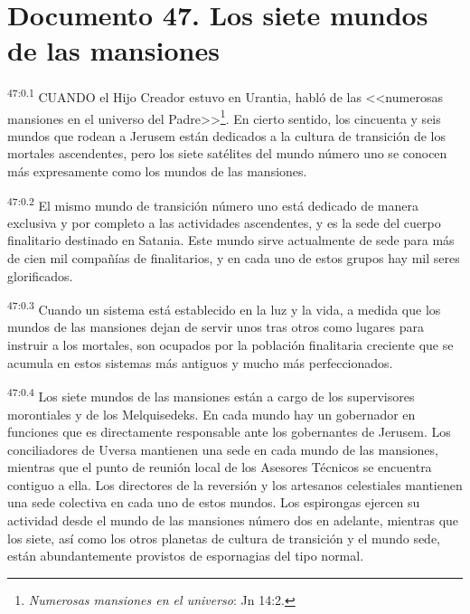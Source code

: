 \chapter{Documento 47. Los siete mundos de las mansiones}
\par
\textsuperscript{47:0.1} CUANDO el Hijo Creador estuvo en Urantia, habló de las <<numerosas mansiones en el universo del Padre>>\footnote{\textit{Numerosas mansiones en el universo}: Jn 14:2.}. En cierto sentido, los cincuenta y seis mundos que rodean a Jerusem están dedicados a la cultura de transición de los mortales ascendentes, pero los siete satélites del mundo número uno se conocen más expresamente como los mundos de las mansiones.

\par
\textsuperscript{47:0.2} El mismo mundo de transición número uno está dedicado de manera exclusiva y por completo a las actividades ascendentes, y es la sede del cuerpo finalitario destinado en Satania. Este mundo sirve actualmente de sede para más de cien mil compañías de finalitarios, y en cada uno de estos grupos hay mil seres glorificados.

\par
\textsuperscript{47:0.3} Cuando un sistema está establecido en la luz y la vida, a medida que los mundos de las mansiones dejan de servir unos tras otros como lugares para instruir a los mortales, son ocupados por la población finalitaria creciente que se acumula en estos sistemas más antiguos y mucho más perfeccionados.

\par
\textsuperscript{47:0.4} Los siete mundos de las mansiones están a cargo de los supervisores morontiales y de los Melquisedeks. En cada mundo hay un gobernador en funciones que es directamente responsable ante los gobernantes de Jerusem. Los conciliadores de Uversa mantienen una sede en cada mundo de las mansiones, mientras que el punto de reunión local de los Asesores Técnicos se encuentra contiguo a ella. Los directores de la reversión y los artesanos celestiales mantienen una sede colectiva en cada uno de estos mundos. Los espirongas ejercen su actividad desde el mundo de las mansiones número dos en adelante, mientras que los siete, así como los otros planetas de cultura de transición y el mundo sede, están abundantemente provistos de espornagias del tipo normal.

